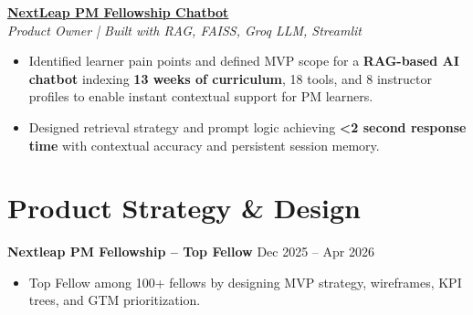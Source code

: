 \documentclass[10pt,a4paper]{article}
\begin{document}
\textbf{\href{https://nextleap-chatbot-jyb6worz7tbwjhh4ywcjhj.streamlit.app/}{NextLeap PM Fellowship Chatbot}} \\
\textit{Product Owner | Built with RAG, FAISS, Groq LLM, Streamlit}
\begin{itemize}
    \item Identified learner pain points and defined MVP scope for a \textbf{RAG-based AI chatbot} indexing \textbf{13 weeks of curriculum}, 18 tools, and 8 instructor profiles to enable instant contextual support for PM learners.
    \item Designed retrieval strategy and prompt logic achieving \textbf{<2 second response time} with contextual accuracy and persistent session memory.
\end{itemize}
\vspace{1pt}


\section{Product Strategy \& Design}
\textbf{Nextleap PM Fellowship -- Top Fellow} \hfill Dec 2025 -- Apr 2026
\begin{itemize}
    \item Top Fellow among 100+ fellows by designing MVP strategy, wireframes, KPI trees, and GTM prioritization.
\end{itemize}
\vspace{1pt}

\end{document}
